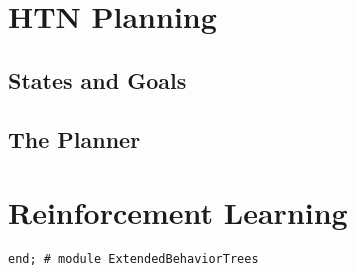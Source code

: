 \documentclass[a4wide]{article}
\begin{document}
\section{HTN Planning}
\label{sec-4}

\subsection{States and Goals}
\label{sec-4-1}

\subsection{The Planner}
\label{sec-4-2}

\section{Reinforcement Learning}
\label{sec-5}

\begin{verbatim}
end; # module ExtendedBehaviorTrees
\end{verbatim}
\end{document}
